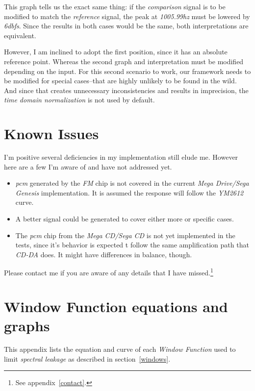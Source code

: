 \documentclass[10pt,a4paper]{report}
\newcommand{\ac}[1]{\textit{\mbox{\acrshort{#1}}}}
\newcommand{\hz}[1]{\textit{\mbox{#1\acrshort{hz}}}}
\newcommand{\db}[1]{\textit{\mbox{#1\acrshort{dbfs}}}}
\begin{document}
\begin{appendices}
This graph tells us the exact same thing: if the \textit{comparison} signal is to be modified to match the \textit{reference} signal, the peak at \hz{1005.99} must be lowered by \db{6}. Since the results in both cases would be the same, both interpretations are equivalent.
	
However, I am inclined to adopt the first position, since it has an absolute reference point. Whereas the second graph and interpretation must be modified depending on the input. For this second scenario to work, our framework needs to be modified for special cases--that are highly unlikely to be found in the wild. And since that creates unnecessary inconsistencies and results in imprecision, the \textit{time domain normalization} is not used by default.

\chapter{Known Issues}

I'm positive several deficiencies in my implementation still elude me. However here are a few I'm aware of and have not addressed yet.

\begin{itemize}
	\item \ac{pcm} generated by the \textit{FM} chip is not covered in the current \textit{Mega Drive/Sega Genesis} implementation. It is assumed the response will follow the \textit{YM2612} curve.
	\item A better signal could  be generated to cover either more or specific cases.
	\item The \ac{pcm} chip from the \textit{Mega CD/Sega CD} is not yet implemented in the tests, since it's behavior is expected t follow the same amplification path that \textit{CD-DA} does. It might have differences in balance, though.
\end{itemize}

Please contact me if you are aware of any details that I have missed.\footnote{See appendix~\ref{contact}.}

\chapter{Window Function equations and graphs}
\label{windowfunctiondetails}

This appendix lists the equation and curve of each \textit{Window Function} used to limit \textit{spectral leakage} as described in section~\ref{windows}.


\end{appendices}
\end{document}
